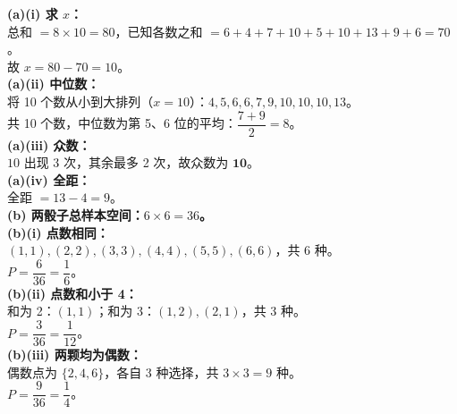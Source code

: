 \documentclass[12pt,a4paper]{ctexart}
\newenvironment{solution}
  {%
    \par\noindent
  }
  {\par}
\begin{document}
\begin{solution}
    \textbf{(a)(i) 求 $x$：} \\
    总和 $= 8\times10 = 80$，已知各数之和 $= 6+4+7+10+5+10+13+9+6 = 70$。\\
    故 $x = 80 - 70 = 10$。\\

    \textbf{(a)(ii) 中位数：} \\
    将 10 个数从小到大排列（$x=10$）：$4,5,6,6,7,9,10,10,10,13$。\\
    共 10 个数，中位数为第 5、6 位的平均：$\dfrac{7+9}{2} = 8$。\\

    \textbf{(a)(iii) 众数：} \\
    $10$ 出现 3 次，其余最多 2 次，故众数为 $\mathbf{10}$。\\

    \textbf{(a)(iv) 全距：} \\
    全距 $= 13 - 4 = 9$。\\

    \textbf{(b) 两骰子总样本空间：$6\times6=36$。} \\

    \textbf{(b)(i) 点数相同：} \\
    $(1,1),(2,2),(3,3),(4,4),(5,5),(6,6)$，共 6 种。\\
    $P = \dfrac{6}{36} = \dfrac{1}{6}$。\\

    \textbf{(b)(ii) 点数和小于 4：} \\
    和为 2：$(1,1)$；和为 3：$(1,2),(2,1)$，共 3 种。\\
    $P = \dfrac{3}{36} = \dfrac{1}{12}$。\\

    \textbf{(b)(iii) 两颗均为偶数：} \\
    偶数点为 $\{2,4,6\}$，各自 3 种选择，共 $3\times3=9$ 种。\\
    $P = \dfrac{9}{36} = \dfrac{1}{4}$。
\end{solution}
\end{document}

